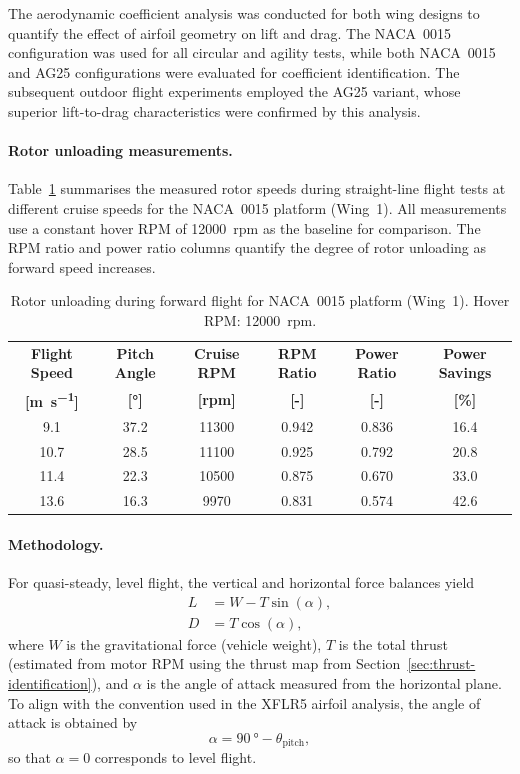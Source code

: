 The aerodynamic coefficient analysis was conducted for both wing designs to quantify the effect of airfoil geometry on lift and drag.
The NACA~0015 configuration was used for all circular and agility tests, while both NACA~0015 and AG25 configurations were evaluated for coefficient identification.
The subsequent outdoor flight experiments employed the AG25 variant, whose superior lift-to-drag characteristics were confirmed by this analysis.

\paragraph{Rotor unloading measurements.}
Table~\ref{tab:rotor_unloading} summarises the measured rotor speeds during straight-line flight tests at different cruise speeds for the NACA~0015 platform (Wing~1).
All measurements use a constant hover RPM of \SI{12000}{rpm} as the baseline for comparison.
The RPM ratio and power ratio columns quantify the degree of rotor unloading as forward speed increases.

\begin{table}[htbp]
\centering
\caption{Rotor unloading during forward flight for NACA~0015 platform (Wing~1). Hover RPM: \SI{12000}{rpm}.}
\label{tab:rotor_unloading}
\begin{tabular}{cccccc}
\hline
\textbf{Flight Speed} & \textbf{Pitch Angle} & \textbf{Cruise RPM} & \textbf{RPM Ratio} & \textbf{Power Ratio} & \textbf{Power Savings} \\
\textbf{[\si{\meter\per\second}]} & \textbf{[\si{\degree}]} & \textbf{[\si{rpm}]} & \textbf{[-]} & \textbf{[-]} & \textbf{[\%]} \\
\hline
9.1  & 37.2 & 11300 & 0.942 & 0.836 & 16.4 \\
10.7 & 28.5 & 11100 & 0.925 & 0.792 & 20.8 \\
11.4 & 22.3 & 10500 & 0.875 & 0.670 & 33.0 \\
13.6 & 16.3 &  9970 & 0.831 & 0.574 & 42.6 \\
\hline
\end{tabular}
\end{table}

\paragraph{Methodology.}
For quasi-steady, level flight, the vertical and horizontal force balances yield
\begin{align}
L &= W - T \sin(\alpha), \label{eq:lift_balance} \\
D &= T \cos(\alpha), \label{eq:drag_balance}
\end{align}
where $W$ is the gravitational force (vehicle weight), $T$ is the total thrust (estimated from motor RPM using the thrust map from Section~\ref{sec:thrust-identification}), and $\alpha$ is the angle of attack measured from the horizontal plane.
To align with the convention used in the XFLR5 airfoil analysis, the angle of attack is obtained by
\begin{equation}
\alpha = \SI{90}{\degree} - \theta_{\text{pitch}},
\end{equation}
so that $\alpha = 0$ corresponds to level flight.

